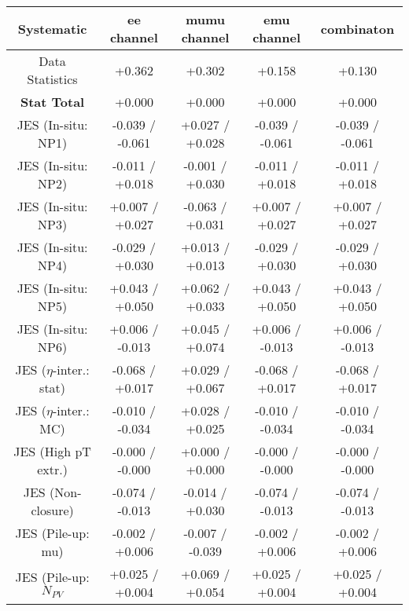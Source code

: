 \begin{table}[htbp]
\scriptsize
  \begin{center} 
  \begin{tabular}{|c|c|c|c|c|}
  \hline
Systematic                            &  ee channel&  mumu channel&  emu channel&  combinaton\\
  \hline
Data Statistics                       &+0.362              & +0.302              & +0.158              & +0.130             \\
\hline
\textbf{Stat Total}                   &+0.000              & +0.000              & +0.000              & +0.000             \\
\hline
JES (In-situ: NP1)                    &-0.039   / -0.061   & +0.027   / +0.028   & -0.039   / -0.061   & -0.039   / -0.061  \\
JES (In-situ: NP2)                    &-0.011   / +0.018   & -0.001   / +0.030   & -0.011   / +0.018   & -0.011   / +0.018  \\
JES (In-situ: NP3)                    &+0.007   / +0.027   & -0.063   / +0.031   & +0.007   / +0.027   & +0.007   / +0.027  \\
JES (In-situ: NP4)                    &-0.029   / +0.030   & +0.013   / +0.013   & -0.029   / +0.030   & -0.029   / +0.030  \\
JES (In-situ: NP5)                    &+0.043   / +0.050   & +0.062   / +0.033   & +0.043   / +0.050   & +0.043   / +0.050  \\
JES (In-situ: NP6)                    &+0.006   / -0.013   & +0.045   / +0.074   & +0.006   / -0.013   & +0.006   / -0.013  \\
JES ($\eta$-inter.: stat)               &-0.068   / +0.017   & +0.029   / +0.067   & -0.068   / +0.017   & -0.068   / +0.017  \\
JES ($\eta$-inter.: MC)                 &-0.010   / -0.034   & +0.028   / +0.025   & -0.010   / -0.034   & -0.010   / -0.034  \\
JES (High pT extr.)                  &-0.000   / -0.000   & +0.000   / +0.000   & -0.000   / -0.000   & -0.000   / -0.000  \\
JES (Non-closure)                     &-0.074   / -0.013   & -0.014   / +0.030   & -0.074   / -0.013   & -0.074   / -0.013  \\
JES (Pile-up: mu)                     &-0.002   / +0.006   & -0.007   / -0.039   & -0.002   / +0.006   & -0.002   / +0.006  \\
JES (Pile-up: $N_{PV}$                  &+0.025   / +0.004   & +0.069   / +0.054   & +0.025   / +0.004   & +0.025   / +0.004  \\

\end{tabular}
\end{center}
\end{table}
